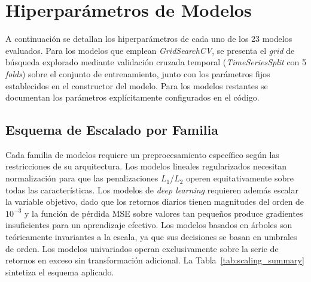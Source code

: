 
\section{Hiperpar\'ametros de Modelos}
\label{app:hyperparameters}

A continuaci\'on se detallan los hiperpar\'ametros de cada uno de los 23 modelos evaluados. Para los modelos que emplean \textit{GridSearchCV}, se presenta el \textit{grid} de b\'usqueda explorado mediante validaci\'on cruzada temporal (\textit{TimeSeriesSplit} con 5 \textit{folds}) sobre el conjunto de entrenamiento, junto con los par\'ametros fijos establecidos en el constructor del modelo. Para los modelos restantes se documentan los par\'ametros expl\'icitamente configurados en el c\'odigo.

\subsection{Esquema de Escalado por Familia}
\label{app:scaling_detail}

Cada familia de modelos requiere un preprocesamiento espec\'ifico seg\'un las restricciones de su arquitectura. Los modelos lineales regularizados necesitan normalizaci\'on para que las penalizaciones $L_1$/$L_2$ operen equitativamente sobre todas las caracter\'isticas. Los modelos de \textit{deep learning} requieren adem\'as escalar la variable objetivo, dado que los retornos diarios tienen magnitudes del orden de $10^{-3}$ y la funci\'on de p\'erdida MSE sobre valores tan peque\~nos produce gradientes insuficientes para un aprendizaje efectivo. Los modelos basados en \'arboles son te\'oricamente invariantes a la escala, ya que sus decisiones se basan en umbrales de orden. Los modelos univariados operan exclusivamente sobre la serie de retornos en exceso sin transformaci\'on adicional. La Tabla~\ref{tab:scaling_summary} sintetiza el esquema aplicado.

